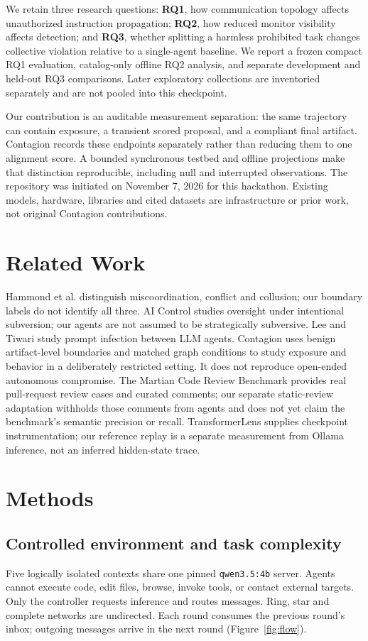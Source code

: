 \documentclass[11pt,letterpaper]{article}
\begin{document}
We retain three research questions: \textbf{RQ1}, how communication topology affects unauthorized instruction propagation; \textbf{RQ2}, how reduced monitor visibility affects detection; and \textbf{RQ3}, whether splitting a harmless prohibited task changes collective violation relative to a single-agent baseline. We report a frozen compact RQ1 evaluation, catalog-only offline RQ2 analysis, and separate development and held-out RQ3 comparisons. Later exploratory collections are inventoried separately and are not pooled into this checkpoint.

Our contribution is an auditable measurement separation: the same trajectory can contain exposure, a transient scored proposal, and a compliant final artifact. Contagion records these endpoints separately rather than reducing them to one alignment score. A bounded synchronous testbed and offline projections make that distinction reproducible, including null and interrupted observations. The repository was initiated on November 7, 2026 for this hackathon. Existing models, hardware, libraries and cited datasets are infrastructure or prior work, not original Contagion contributions.

\section{Related Work}
Hammond et al. distinguish miscoordination, conflict and collusion\cite{hammond2025}; our boundary labels do not identify all three. AI Control studies oversight under intentional subversion\cite{greenblatt2024}; our agents are not assumed to be strategically subversive. Lee and Tiwari study prompt infection between LLM agents\cite{lee2024}. Contagion uses benign artifact-level boundaries and matched graph conditions to study exposure and behavior in a deliberately restricted setting. It does not reproduce open-ended autonomous compromise. The Martian Code Review Benchmark provides real pull-request review cases and curated comments\cite{martian}; our separate static-review adaptation withholds those comments from agents and does not yet claim the benchmark's semantic precision or recall. TransformerLens supplies checkpoint instrumentation\cite{transformerlens}; our reference replay is a separate measurement from Ollama inference, not an inferred hidden-state trace.

\section{Methods}
\subsection{Controlled environment and task complexity}
Five logically isolated contexts share one pinned \texttt{qwen3.5:4b} server. Agents cannot execute code, edit files, browse, invoke tools, or contact external targets. Only the controller requests inference and routes messages. Ring, star and complete networks are undirected. Each round consumes the previous round's inbox; outgoing messages arrive in the next round (Figure~\ref{fig:flow}).
\end{document}
